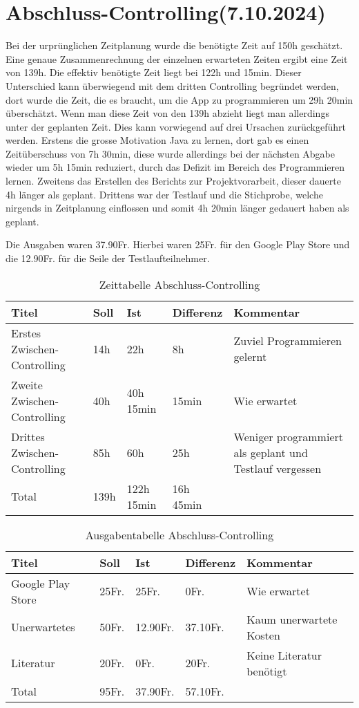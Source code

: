 \newpage
\section{Abschluss-Controlling(7.10.2024)}

Bei der urprünglichen Zeitplanung wurde die benötigte Zeit auf 150h geschätzt. Eine genaue Zusammenrechnung der einzelnen erwarteten Zeiten ergibt eine Zeit von 139h. Die effektiv benötigte Zeit liegt bei 122h und 15min. Dieser Unterschied kann überwiegend mit dem dritten Controlling begründet werden, dort wurde die Zeit, die es braucht, um die App zu programmieren um 29h 20min überschätzt. Wenn man diese Zeit von den 139h abzieht liegt man allerdings unter der geplanten Zeit. Dies kann vorwiegend auf drei Ursachen zurückgeführt werden. Erstens die grosse Motivation Java zu lernen, dort gab es einen Zeitüberschuss von 7h 30min, diese wurde allerdings bei der nächsten Abgabe wieder um 5h 15min reduziert, durch das Defizit im Bereich des Programmieren lernen. Zweitens das Erstellen des Berichts zur Projektvorarbeit, dieser dauerte 4h länger als geplant. Drittens war der Testlauf und die Stichprobe, welche nirgends in Zeitplanung einflossen und somit 4h 20min länger gedauert haben als geplant. \par
Die Ausgaben waren 37.90Fr. Hierbei waren 25Fr. für den Google Play Store und die 12.90Fr. für die Seile der Testlaufteilnehmer.

\begin{table}[h]
    \begin{tabularx}{\textwidth}{X|X|X|X|X}
        \textbf{Titel} & \textbf{Soll} & \textbf{Ist} & \textbf{Differenz} & \textbf{Kommentar} \\ \hline
        Erstes Zwischen-Controlling & 14h & 22h & 8h & Zuviel Programmieren gelernt \\\hline
        Zweite Zwischen-Controlling & 40h & 40h 15min & 15min & Wie erwartet \\\hline
        Drittes Zwischen-Controlling & 85h & 60h & 25h & Weniger programmiert als geplant und Testlauf vergessen \\\hline
        Total & 139h & 122h 15min & 16h 45min & \\
    \end{tabularx}
    \caption{Zeittabelle Abschluss-Controlling}
\end{table}

\begin{table}[h]
    \begin{tabularx}{\textwidth}{X|X|X|X|X}
        \textbf{Titel} & \textbf{Soll} & \textbf{Ist} & \textbf{Differenz} & \textbf{Kommentar} \\ \hline
        Google Play Store & 25Fr. & 25Fr. & 0Fr. & Wie erwartet \\\hline
        Unerwartetes & 50Fr. & 12.90Fr. & 37.10Fr. & Kaum unerwartete Kosten \\\hline
        Literatur & 20Fr. & 0Fr. & 20Fr. & Keine Literatur benötigt \\\hline
        Total & 95Fr. & 37.90Fr. & 57.10Fr. & \\
    \end{tabularx}
    \caption{Ausgabentabelle Abschluss-Controlling}
\end{table}